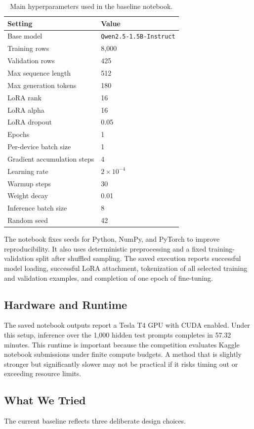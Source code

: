 \documentclass[11pt]{article}
\begin{document}
\begin{table}[t]
\centering
\small
\begin{tabular}{ll}
\toprule
Setting & Value \\
\midrule
Base model & \texttt{Qwen2.5-1.5B-Instruct} \\
Training rows & 8,000 \\
Validation rows & 425 \\
Max sequence length & 512 \\
Max generation tokens & 180 \\
LoRA rank & 16 \\
LoRA alpha & 16 \\
LoRA dropout & 0.05 \\
Epochs & 1 \\
Per-device batch size & 1 \\
Gradient accumulation steps & 4 \\
Learning rate & \(2 \times 10^{-4}\) \\
Warmup steps & 30 \\
Weight decay & 0.01 \\
Inference batch size & 8 \\
Random seed & 42 \\
\bottomrule
\end{tabular}
\caption{Main hyperparameters used in the baseline notebook.}
\label{tab:hparams}
\end{table}

The notebook fixes seeds for Python, NumPy, and PyTorch to improve reproducibility. It also uses deterministic preprocessing and a fixed training-validation split after shuffled sampling. The saved execution reports successful model loading, successful LoRA attachment, tokenization of all selected training and validation examples, and completion of one epoch of fine-tuning.

\subsection{Hardware and Runtime}
The saved notebook outputs report a Tesla T4 GPU with CUDA enabled. Under this setup, inference over the 1,000 hidden test prompts completes in 57.32 minutes. This runtime is important because the competition evaluates Kaggle notebook submissions under finite compute budgets. A method that is slightly stronger but significantly slower may not be practical if it risks timing out or exceeding resource limits.

\subsection{What We Tried}
The current baseline reflects three deliberate design choices.
\end{document}
